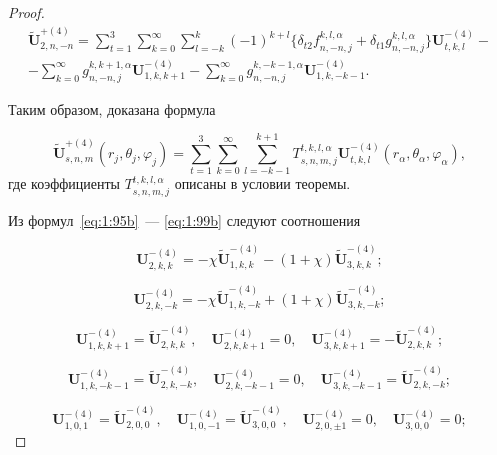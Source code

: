\begin{proof}
\begin{multline}
\mathbf{\tilde U}_{2,n,-n}^{+(4)}=\sum\limits_{t=1}^3\sum\limits_{k=0}^\infty\sum\limits_{l=-k}^{k}(-1)^{k+l}\bigg\{\delta_{t2}{f}_{n,-n,j}^{k,l,\alpha}+\delta_{t1}{g}_{n,-n,j}^{k,l,\alpha}\bigg\}\mathbf{U}_{t,k,l}^{-(4)}- \\
-\sum\limits_{k=0}^\infty{g}_{n,-n,j}^{k,k+1,\alpha}\mathbf{U}_{1,k,k+1}^{-(4)}-\sum\limits_{k=0}^\infty{g}_{n,-n,j}^{k,-k-1,\alpha}\mathbf{U}_{1,k,-k-1}^{-(4)}.
\label{eq:1:113r}
\end{multline}

Таким образом, доказана формула

\begin{equation}
\mathbf{\tilde U}_{s,n,m}^{+(4)}(r_j,\theta_j,\varphi_j)=\sum\limits_{t=1}^3\sum\limits_{k=0}^\infty\sum\limits_{l=-k-1}^{k+1}T_{s,n,m,j}^{t,k,l,\alpha}\mathbf{U}_{t,k,l}^{-(4)}(r_\alpha,\theta_\alpha,\varphi_\alpha),
\label{eq:1:114r}
\end{equation}
где коэффициенты $T_{s,n,m,j}^{t,k,l,\alpha}$ описаны в условии теоремы.

Из формул~\eqref{eq:1:95b}~--- \eqref{eq:1:99b} следуют соотношения

\begin{equation}
\mathbf{U}_{2,k,k}^{-(4)}=-\chi\mathbf{\tilde U}_{1,k,k}^{-(4)}-(1+\chi)\mathbf{\tilde U}_{3,k,k}^{-(4)};
\label{eq:1:115r}
\end{equation}

\begin{equation}
\mathbf{U}_{2,k,-k}^{-(4)}=-\chi\mathbf{\tilde U}_{1,k,-k}^{-(4)}+(1+\chi)\mathbf{\tilde U}_{3,k,-k}^{-(4)};
\label{eq:1:116r}
\end{equation}

\begin{equation}
\mathbf{U}_{1,k,k+1}^{-(4)}=\mathbf{\tilde U}_{2,k,k}^{-(4)},\quad\mathbf{U}_{2,k,k+1}^{-(4)}=0,\quad\mathbf{U}_{3,k,k+1}^{-(4)}=-\mathbf{\tilde U}_{2,k,k}^{-(4)};
\label{eq:1:117r}
\end{equation}

\begin{equation}
\mathbf{U}_{1,k,-k-1}^{-(4)}=\mathbf{\tilde U}_{2,k,-k}^{-(4)},\quad\mathbf{U}_{2,k,-k-1}^{-(4)}=0,\quad\mathbf{U}_{3,k,-k-1}^{-(4)}=\mathbf{\tilde U}_{2,k,-k}^{-(4)};
\label{eq:1:118r}
\end{equation}

\begin{equation}
\mathbf{U}_{1,0,1}^{-(4)}=\mathbf{\tilde U}_{2,0,0}^{-(4)},\quad\mathbf{U}_{1,0,-1}^{-(4)}=\mathbf{\tilde U}_{3,0,0}^{-(4)},\quad\mathbf{U}_{2,0,\pm 1}^{-(4)}=0,\quad\mathbf{U}_{3,0,0}^{-(4)}=0;
\label{eq:1:119r}
\end{equation}


\end{proof}
